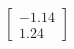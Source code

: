 \documentclass[preview]{standalone}
\begin{document}
\begin{align*}
\begin{bmatrix} -1.14 \\ 1.24 \end{bmatrix}
\end{align*}
\end{document}
